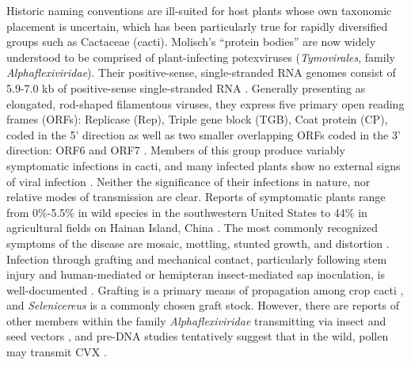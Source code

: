 \documentclass[fleqn,10pt,lineno]{wlpeerj}
\begin{document}
Historic naming conventions are ill-suited for host plants whose own taxonomic placement is uncertain, which has been particularly true for rapidly diversified groups such as Cactaceae (cacti).
Molisch's ``protein bodies'' are now widely understood to be comprised of plant-infecting potexviruses (\textit{Tymovirales}, family \textit{Alphaflexiviridae}).
Their positive-sense, single-stranded RNA genomes consist of 5.9-7.0 kb of positive-sense single-stranded RNA \citep{martelli_family_2007}.
Generally presenting as elongated, rod-shaped filamentous viruses, they express five primary open reading frames (ORFs): Replicase (Rep), Triple gene block (TGB), Coat protein (CP), coded in the 5' direction as well as two smaller overlapping ORFs coded in the 3' direction: ORF6 and ORF7 \citep{martelli_family_2007}. 
Members of this group produce variably symptomatic infections in cacti, and many infected plants show no external signs of viral infection \citep{bos_symptoms_1977, liou_complete_2004}. 
Neither the significance of their infections in nature, nor relative modes of transmission are clear. 
Reports of symptomatic plants range from 0\%-5.5\% in wild species in the southwestern United States \citep{attathom_occurrence_1978} to 44\% in agricultural fields on Hainan Island, China \citep{peng_molecular_2016}.
The most commonly recognized symptoms of the disease are mosaic, mottling, stunted growth, and distortion \citep{attathom_occurrence_1978, maliarenko_cactus_2013, peng_molecular_2016}.
Infection through grafting and mechanical contact, particularly following stem injury and human-mediated or hemipteran insect-mediated sap inoculation, is well-documented \citep{liou_complete_2004,maliarenko_cactus_2013,park_detection_2018}.
Grafting is a primary means of propagation among crop cacti \citep{park_detection_2018}, and \textit{Selenicereus} is a commonly chosen graft stock.
However, there are reports of other members within the family \textit{Alphaflexiviridae} transmitting via insect and seed vectors \citep{martelli_family_2007}, and pre-DNA studies tentatively suggest that in the wild, pollen may transmit CVX \citep{attathom_occurrence_1978}.
\end{document}
